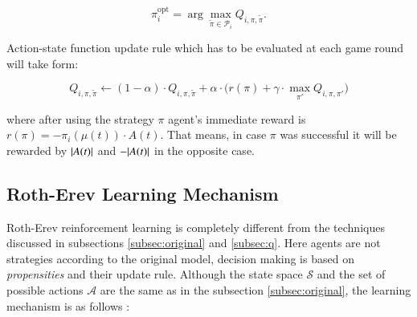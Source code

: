 \documentclass[12pt,american,czech]{article}
\begin{document}
\begin{equation}
\pi_{i}^{\text{opt}} = \arg \max_{\tilde{\pi}\in\mathcal{P}_{i}} Q_{i,\pi,\tilde{\pi}}.
\end{equation}


Action-state function update rule which has to be evaluated at each game round will take form:

\begin{equation}
Q_{i,\pi,\tilde{\pi}}\leftarrow (1-\alpha)\cdot Q_{i,\pi,\tilde{\pi}}+\alpha\cdot\big(r(\pi)+\gamma\cdot\max_{\pi'}Q_{i,\pi,\pi'}\big)
\end{equation}

\noindent
where after using the strategy $\pi$ agent's immediate reward is $r(\pi)=-\pi_{i}(\mu(t))\cdot A(t)$. That means, in case $\pi$ was successful it will be rewarded by $\arrowvert A(t)\arrowvert$  and $-\arrowvert A(t)\arrowvert$ in the opposite case.

\subsection{Roth-Erev Learning Mechanism}\label{subsec:rerl}

Roth-Erev reinforcement learning is completely different from the techniques discussed in subsections \ref{subsec:original} and \ref{subsec:q}. Here agents are not strategies according to the original model, decision making is based on \textit{propensities} and their update rule. Although the state space $\mathcal{S}$ and the set of possible actions $\mathcal{A}$ are the same as in the subsection \ref{subsec:original}, the learning mechanism is as follows \cite{WHITEHEAD2008}:
\end{document}
